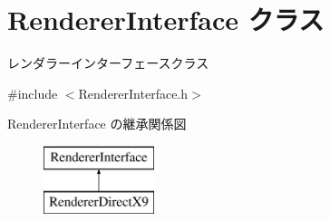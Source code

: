 \hypertarget{class_renderer_interface}{}\section{Renderer\+Interface クラス}
\label{class_renderer_interface}


レンダラーインターフェースクラス  




{\ttfamily \#include $<$Renderer\+Interface.\+h$>$}

Renderer\+Interface の継承関係図\begin{figure}[H]
\begin{center}
\leavevmode
\includegraphics[height=2.000000cm]{class_renderer_interface}
\end{center}
\end{figure}

